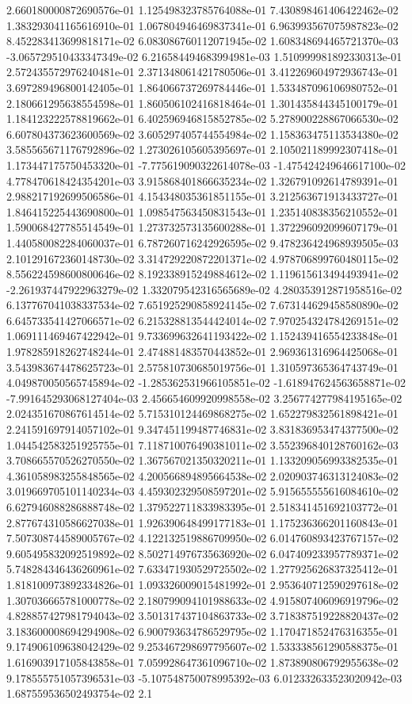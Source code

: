 2.660180000872690576e-01	1.125498323785764088e-01	7.430898461406422462e-02	1.383293041165616910e-01	1.067804946469837341e-01	6.963993567075987823e-02	8.452283413699818171e-02	6.083086760112071945e-02	1.608348694465721370e-03	-3.065729510433347349e-02	6.216584494683994981e-03	1.510999981892330313e-01	2.572435572976240481e-01	2.371348061421780506e-01	3.412269604972936743e-01	3.697289496800142405e-01	1.864066737269784446e-01	1.533487096106980752e-01	2.180661295638554598e-01	1.860506102416818464e-01	1.301435844345100179e-01	1.184123222578819662e-01	6.402596946815852785e-02	5.278900228867066530e-02	6.607804373623600569e-02	3.605297405744554984e-02	1.158363475113534380e-02	3.585565671176792896e-02	1.273026105605395697e-01	2.105021189992307418e-01	1.173447175750453320e-01	-7.775619090322614078e-03	-1.475424249646617100e-02	4.778470618424354201e-03	3.915868401866635234e-02	1.326791092614789391e-01	2.988217192699506586e-01	4.154348035361851155e-01	3.212563671913433727e-01	1.846415225443690800e-01	1.098547563450831543e-01	1.235140838356210552e-01	1.590068427785514549e-01	1.273732573135600288e-01	1.372296092099607179e-01	1.440580082284060037e-01	6.787260716242926595e-02	9.478236424968939505e-03	2.101291672360148730e-02	3.314729220872201371e-02	4.978706899760480115e-02	8.556224598600800646e-02	8.192338915249884612e-02	1.119615613494493941e-02	-2.261937447922963279e-02	1.332079542316565689e-02	4.280353912871958516e-02	6.137767041038337534e-02	7.651925290858924145e-02	7.673144629458580890e-02	6.645733541427066571e-02	6.215328813544424014e-02	7.970254324784269151e-02	1.069111469467422942e-01	9.733699632641193422e-02	1.152439416554233848e-01	1.978285918262748244e-01	2.474881483570443852e-01	2.969361316964425068e-01	3.543983674478625723e-01	2.575810730685019756e-01	1.310597365364743749e-01	4.049870050565745894e-02	-1.285362531966105851e-02	-1.618947624563658871e-02	-7.991645293068127404e-03	2.456654609920998558e-02	3.256774277984195165e-02	2.024351670867614514e-02	5.715310124469868275e-02	1.652279832561898421e-01	2.241591697914057102e-01	9.347451199487746831e-02	3.831836953474377500e-02	1.044542583251925755e-01	7.118710076490381011e-02	3.552396840128760162e-03	3.708665570526270550e-02	1.367567021350320211e-01	1.133209056993382535e-01	4.361058983255848565e-02	4.200566894895664538e-02	2.020903746313124083e-02	3.019669705101140234e-03	4.459302329508597201e-02	5.915655555616084610e-02	6.627946088286888748e-02	1.379522711833983395e-01	2.518341451692103772e-01	2.877674310586627038e-01	1.926390648499177183e-01	1.175236366201160843e-01	7.507308744589005767e-02	4.122132519886709950e-02	6.014760893423767157e-02	9.605495832092519892e-02	8.502714976735636920e-02	6.047409233957789371e-02	5.748284346436260961e-02	7.633471930529725502e-02	1.277925626837325412e-01	1.818100973892334826e-01	1.093326009015481992e-01	2.953640712590297618e-02	1.307036665781000778e-02	2.180799094101988633e-02	4.915807406096919796e-02	4.828857427981794043e-02	3.501317437104863733e-02	3.718387519228820437e-02	3.183600008694294908e-02	6.900793634786529795e-02	1.170471852476316355e-01	9.174906109638042429e-02	9.253467298697795607e-02	1.533338561290588375e-01	1.616903917105843858e-01	7.059928647361096710e-02	1.873890806792955638e-02	9.178555751057396531e-03	-5.107548750078995392e-03	6.012332633523020942e-03	1.687559536502493754e-02	2.1